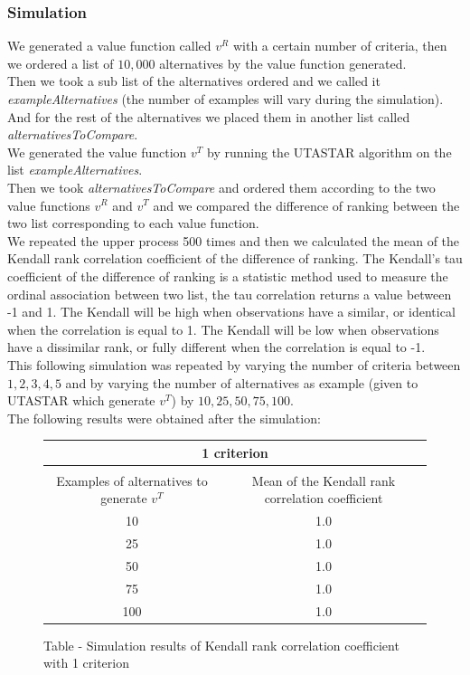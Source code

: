 \documentclass{report}
\begin{document}
\subsubsection{Simulation}
We generated a value function called $v^R$ with a certain number of criteria, then we ordered a list of $10,000$ alternatives by the value function generated.\\
Then we took a sub list of the alternatives ordered and we called it \textit{exampleAlternatives} (the number of examples will vary during the simulation). And for the rest of the alternatives we placed them in another list called \textit{alternativesToCompare}.\\
We generated the value function $v^T$ by running the UTASTAR algorithm on the list \textit{exampleAlternatives}. \\
Then we took \textit{alternativesToCompare} and ordered them according to the two value functions $v^R$ and $v^T$ and we compared the difference of ranking between the two list corresponding to each value function.\\
We repeated the upper process 500 times and then we calculated the mean of the Kendall rank correlation coefficient of the difference of ranking. The Kendall's tau coefficient of the difference of ranking is a statistic method used to measure the ordinal association between two list, the tau correlation returns a value between -1 and 1. The Kendall will be high when observations have a similar, or identical when the correlation is equal to 1. The Kendall will be low when observations have a dissimilar rank, or fully different when the correlation is equal to -1.\\
This following simulation was repeated by varying the number of criteria between $1,2,3,4,5$ and by varying the number of alternatives as example (given to UTASTAR which generate $v^T$) by $10, 25, 50, 75, 100$.\\
The following results were obtained after the simulation:\\

\begin{figure}[H] 
\begin{center}
\begin{tabular}{ |c||c| }
 \hline
 \multicolumn{2}{|c|}{1 criterion} \\
 \hline
\\[-1em] Examples of alternatives to generate $v^T$& Mean of the Kendall rank correlation coefficient \\
 \hline
 10   & 1.0\\
 25   & 1.0\\
 50   & 1.0\\
 75  & 1.0\\
 100   & 1.0\\
 \hline
\end{tabular}
\end{center}
\caption{Table - Simulation results of Kendall rank correlation coefficient with 1 criterion}
\end{figure}
\end{document}

